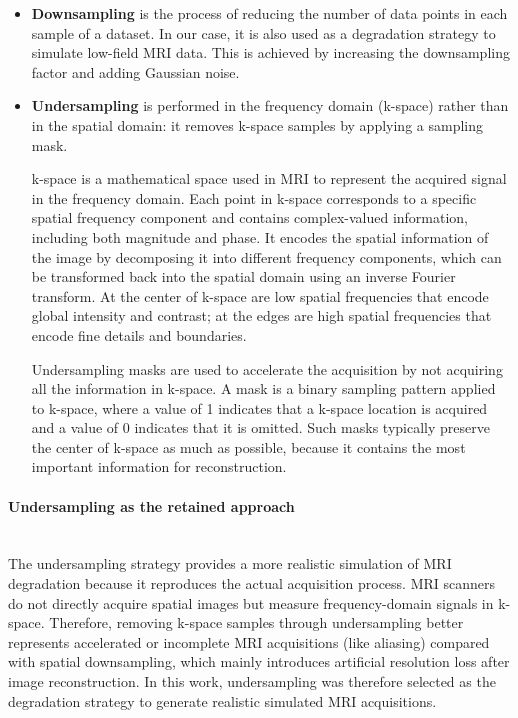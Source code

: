 \documentclass[12pt]{article}
\begin{document}
\begin{itemize}
    \item \textbf{Downsampling} is the process of reducing the number of data points in each sample of a dataset.
    In our case, it is also used as a degradation strategy to simulate low-field MRI data.
    This is achieved by increasing the downsampling factor and adding Gaussian noise.

    \item \textbf{Undersampling} is performed in the frequency domain (k-space) rather than in the spatial domain: it removes k-space samples by applying a sampling mask.
    
    k-space is a mathematical space used in MRI to represent the acquired signal in the frequency domain. 
    Each point in k-space corresponds to a specific spatial frequency component and contains complex-valued information, including both magnitude and phase. 
    It encodes the spatial information of the image by decomposing it into different frequency components, which can be transformed back into the spatial domain using an inverse Fourier transform.
    At the center of k-space are low spatial frequencies that encode global intensity and contrast; at the edges are high spatial frequencies that encode fine details and boundaries.

    Undersampling masks are used to accelerate the acquisition by not acquiring all the information in k-space.
    A mask is a binary sampling pattern applied to k-space, where a value of 1 indicates that a k-space location is acquired and a value of 0 indicates that it is omitted.
    Such masks typically preserve the center of k-space as much as possible, because it contains the most important information for reconstruction.
\end{itemize}

\paragraph{Undersampling as the retained approach}
\mbox{}\\


The undersampling strategy provides a more realistic simulation of MRI degradation because it reproduces the actual acquisition process. 
MRI scanners do not directly acquire spatial images but measure frequency-domain signals in k-space. 
Therefore, removing k-space samples through undersampling better represents accelerated or incomplete MRI acquisitions (like aliasing) compared with spatial downsampling, which mainly introduces artificial resolution loss after image reconstruction.
In this work, undersampling was therefore selected as the degradation strategy to generate realistic simulated MRI acquisitions.
\end{document}
